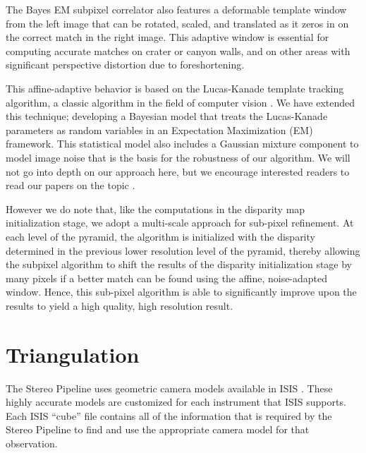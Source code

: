 The Bayes EM subpixel correlator also features a deformable template
window from the left image that can be rotated, scaled, and translated
as it zeros in on the correct match in the right image.  This
adaptive window is essential for computing accurate matches on crater
or canyon walls, and on other areas with significant perspective
distortion due to foreshortening.  

This affine-adaptive behavior is based on the Lucas-Kanade template
tracking algorithm, a classic algorithm in the field of computer
vision \citep{Baker04:lucas-kanade}.  We have extended this technique;
developing a Bayesian model that treats the Lucas-Kanade parameters
as random variables in an Expectation Maximization (EM) framework.
This statistical model also includes a Gaussian mixture component
to model image noise that is the basis for the robustness of our
algorithm.  We will not go into depth on our approach here, but we
encourage interested readers to read our papers on the topic
\citep{nefian:bayes_em, broxton:isvc09}.

However we do note that, like the computations in the disparity map
initialization stage, we adopt a multi-scale approach for sub-pixel
refinement. At each level of the pyramid, the algorithm is initialized
with the disparity determined in the previous lower resolution level
of the pyramid, thereby allowing the subpixel algorithm to shift the
results of the disparity initialization stage by many pixels if a better
match can be found using the affine, noise-adapted window.  Hence,
this sub-pixel algorithm is able to significantly improve upon the
results to yield a high quality, high resolution result.

\section{Triangulation}

The Stereo Pipeline uses geometric camera models available in
\ac{ISIS} \citep{anderson08:isis}.  These highly accurate models
are customized for each instrument that \ac{ISIS} supports.  Each
\ac{ISIS} ``cube'' file contains all of the information that is
required by the Stereo Pipeline to find and use the appropriate
camera model for that observation.

